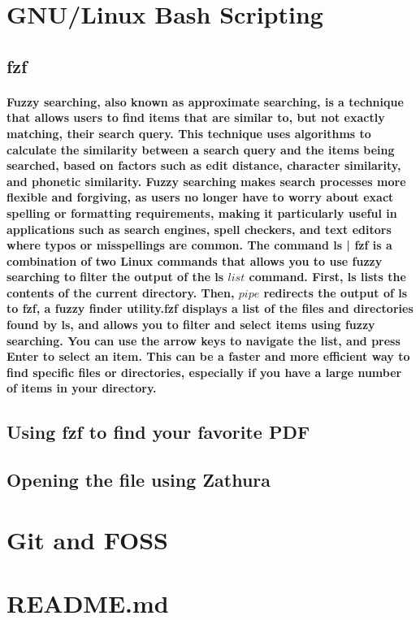 \documentclass[12pt]{article}
\begin{document}
\section{GNU/Linux Bash Scripting}
\subsection{fzf}
\paragraph{Fuzzy searching, also known as approximate searching, is a technique that allows users to find items that are similar to, but not exactly matching, their search query. This technique uses algorithms to calculate the similarity between a search query and the items being searched, based on factors such as edit distance, character similarity, and phonetic similarity. Fuzzy searching makes search processes more flexible and forgiving, as users no longer have to worry about exact spelling or formatting requirements, making it particularly useful in applications such as search engines, spell checkers, and text editors where typos or misspellings are common.
The command ls | fzf is a combination of two Linux commands that allows you to use fuzzy searching to filter the output of the ls \(list\) command. First, ls lists the contents of the current directory. Then, \| \(pipe\) redirects the output of ls to fzf, a fuzzy finder utility.fzf displays a list of the files and directories found by ls, and allows you to filter and select items using fuzzy searching. You can use the arrow keys to navigate the list, and press Enter to select an item. This can be a faster and more efficient way to find specific files or directories, especially if you have a large number of items in your directory.}


\subsection{Using fzf to find your favorite PDF}
\paragraph{}
\subsection{Opening the file using Zathura}
\section{Git and FOSS}
\section{\bf{README.md}}
\end{document}
